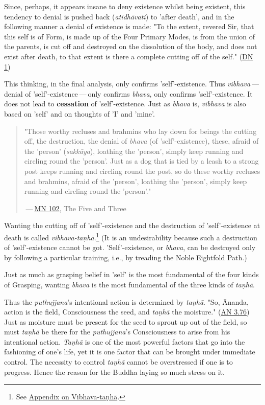 Since, perhaps, it appears insane to deny existence whilst being
existent, this tendency to denial is pushed back (\emph{atidhāvati}) to
'after death', and in the following manner a denial of existence is
made: "To the extent, revered Sir, that this self is of Form, is made up
of the Four Primary Modes, is from the union of the parents, is cut off
and destroyed on the dissolution of the body, and does not exist after
death, to that extent is there a complete cutting off of the
self." (\href{https://suttacentral.net/dn1/en/bodhi}{DN 1})


This thinking, in the final analysis, only confirms 'self'-existence.
Thus \emph{vibhava} — denial of 'self'-existence — only confirms \emph{bhava},
only confirms 'self'-existence. It does not lead to \textbf{cessation} of
'self'-existence. Just as \emph{bhava} is, \emph{vibhava} is also based on 'self'
and on thoughts of 'I' and 'mine'.


\begin{quotation}
"Those worthy recluses and brahmins
who lay down for beings the cutting off, the destruction, the denial of
\emph{bhava} (of 'self'-existence), these, afraid of the 'person'
(\emph{sakkāya}), loathing the 'person', simply keep running and circling
round the 'person'. Just as a dog that is tied by a leash to a strong
post keeps running and circling round the post, so do these worthy
recluses and brahmins, afraid of the 'person', loathing the 'person',
simply keep running and circling round the 'person'."


 — \href{https://suttacentral.net/mn102/en/sujato}{MN 102}, The Five and Three


\end{quotation}

Wanting the cutting off of 'self'-existence and the destruction of
'self'-existence at death is called \emph{vibhava-taṇhā}.\footnote{See \hyperlink{ch-99-appendix#vibhava-tanha}{Appendix on Vibhava-taṇhā}.} (It is an
undesirability because such a destruction of 'self'-existence cannot be
got. 'Self'-existence, or \emph{bhava}, can be destroyed only by following
a particular training, i.e., by treading the Noble Eightfold Path.)


Just as much as grasping belief in 'self' is the most fundamental of the
four kinds of Grasping, wanting \emph{bhava} is the most fundamental of the
three kinds of \emph{taṇhā}.


Thus the \emph{puthujjana}'s intentional action is determined by \emph{taṇhā}.
"So, Ānanda, action is the field, Consciousness the seed, and \emph{taṇhā}
the moisture." (\href{https://suttacentral.net/an3.76/en/thanissaro}{AN 3.76})
Just as moisture must be present for the seed to sprout up
out of the field, so must \emph{taṇhā} be there for the \emph{puthujjana}'s
Consciousness to arise from his intentional action. \emph{Taṇhā} is one of
the most powerful factors that go into the fashioning of one’s life, yet
it is one factor that can be brought under immediate control. The
necessity to control \emph{taṇhā} cannot be overstressed if one is to
progress. Hence the reason for the Buddha laying so much stress on it.


